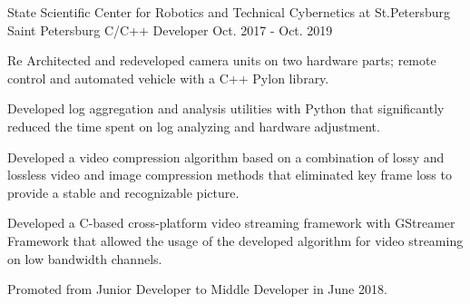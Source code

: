 \begin{cventries}
  \cventry
    {State Scientific Center for Robotics and Technical Cybernetics at St.Petersburg}
    {Saint Petersburg}
    {C/C++ Developer}
    {Oct. 2017 - Oct. 2019}
    {
      \begin{cvitems}
        \item{Re Architected and redeveloped camera units on two hardware parts; remote control and automated vehicle with a C++ Pylon library.}
        \item{Developed log aggregation and analysis utilities with Python that significantly reduced the time spent on log analyzing and hardware adjustment.}
        \item{Developed a video compression algorithm based on a combination of lossy and lossless video and image compression methods that eliminated key frame loss to provide a stable and recognizable picture.}
        \item{Developed a C-based cross-platform video streaming framework with GStreamer Framework that allowed the usage of the developed algorithm for video streaming on low bandwidth channels.}
        \item{Promoted from Junior Developer to Middle Developer in June 2018.}
      \end{cvitems}
    }

\end{cventries}
